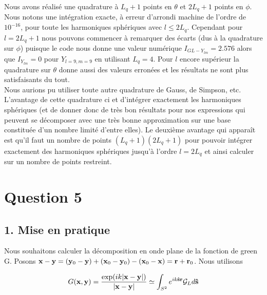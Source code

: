 \documentclass[10pt]{article}
\begin{document}
\begin{multicols}{2}
Nous avons réalisé une quadrature à $L_q+1$ points en $\theta$ et $2L_q+1$ points en $\phi$. Nous notons une intégration exacte, à erreur d'arrondi machine de l'ordre de $10^{-16}$, pour toute les harmoniques sphériques avec $l\le 2L_q$. Cependant pour $l = 2L_q+1$ nous pouvons commencer à remarquer des écarts (dus à la quadrature sur $\phi$) puisque le code nous donne une valeur numérique $I_{GL-Y_{lm}} = 2.576$ alors que $I_{Y_{lm}} = 0$ pour $Y_{l=9,m=9}$ en utilisant $L_q = 4$. Pour $l$ encore supérieur la quadrature sur $\theta$ donne aussi des valeurs erronées et les résultats ne sont plus satisfaisants du tout.\\
\indent
Nous aurions pu utiliser toute autre quadrature de Gauss, de Simpson, etc. L'avantage de cette quadrature ci et d'intégrer exactement les harmoniques sphériques (et de donner donc de très bon résultats pour nos expressions qui peuvent se décomposer avec une très bonne approximation sur une base constituée d'un nombre limité d'entre elles). Le deuxième avantage qui apparaît est qu'il faut un nombre de points $(L_q+1)(2L_q+1)$ pour pouvoir intégrer exactement des harmoniques sphériques jusqu'à l'ordre $l=2L_q$ et ainsi calculer sur un nombre de points restreint. \\












\section*{Question 5}

\subsection*{1. Mise en pratique}

Nous souhaitons calculer la décomposition en onde plane de la fonction de green G. Posons ${\bf x} - {\bf y} = ({\bf y}_0 - {\bf y}) + ({\bf x}_0 - {\bf y}_0) - ({\bf x}_0 - {\bf x}) = {\bf r} + {\bf r}_0$. Nous utilisons

\begin{equation}
	G({\bf x}, {\bf y}) = \frac{\exp(ik|{\bf x}-{\bf y}|)}{|{\bf x}-{\bf y}|} \simeq \int_{S^{2}}{e^{ik{\bf \hat{s}}{\bf r}}\mathcal{G}_Ld{\bf \hat{s}}}
\end{equation}

\vspace*{-11pt}


\end{multicols}
\end{document}
